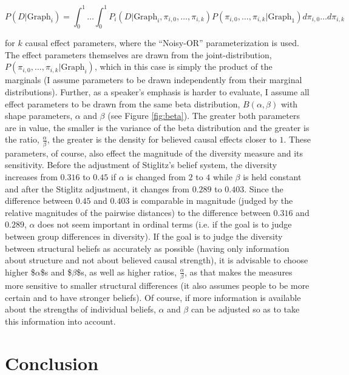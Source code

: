 \documentclass[11pt]{article}
\begin{document}
$$P(D | \text{Graph}_i)=\int_0^1 \hdots \int_0^1 P_i(D | \text{Graph}_i, \pi_{i, 0},\ldots, \pi_{i, k})P(\pi_{i, 0},\ldots, \pi_{i, k} | \text{Graph}_1) d\pi_{i, 0}\hdots d\pi_{i, k}$$

for $k$ causal effect parameters, where the ``Noisy-OR'' parameterization is used. The effect parameters themselves are drawn from the joint-distribution, $P(\pi_{i, 0}, \ldots, \pi_{i, k} | \text{Graph}_i)$, which in this case is simply the product of the marginals (I assume parameters to be drawn independently from their marginal distributions). Further, as a speaker's emphasis is harder to evaluate, I assume all effect parameters to be drawn from the same beta distribution, $B(\alpha, \beta)$ with shape parameters, $\alpha$ and $\beta$ (see Figure \ref{fig:beta}). The greater both parameters are in value, the smaller is the variance of the beta distribution and the greater is the ratio, $\frac{\alpha}{\beta}$, the greater is the density for believed causal effects closer to $1$. These parameters, of course, also effect the magnitude of the diversity measure and its sensitivity. Before the adjustment of Stiglitz's belief system, the diversity increases from $0.316$ to $0.45$ if $\alpha$ is changed from $2$ to $4$ while $\beta$ is held constant and after the Stiglitz adjustment, it changes from $0.289$ to $0.403$. Since the difference between $0.45$ and $0.403$ is comparable in magnitude (judged by the relative magnitudes of the pairwise distances) to the difference between $0.316$ and $0.289$, $\alpha$ does not seem important in ordinal terms (i.e. if the goal is to judge between group differences in diversity). If the goal is to judge the diversity between structural beliefs as accurately as possible (having only information about structure and not about believed causal strength), it is advisable to choose higher \$$\alpha$\$s and \$$\beta$\$s, as well as higher ratios, $\frac{\alpha}{\beta}$, as that makes the measures more sensitive to smaller structural differences (it also assumes people to be more certain and to have stronger beliefs). Of course, if more information is available about the strengths of individual beliefs, $\alpha$ and $\beta$ can be adjusted so as to take this information into account.
\section{Conclusion}
\label{sec-5}
\end{document}
